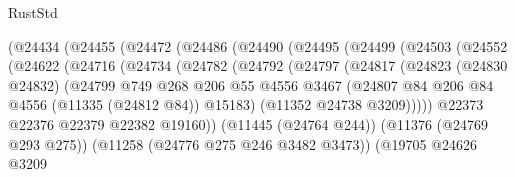 \begin{lexlean}{RustStd}
\begin{coremodule}
{\begin{coremodule}
{{{{{{{{{{{{{{{{{{{{{{{{{{{{{{{{{{{{{{{{{{{{{{{{{{{{{{{{{{{{{{{{{{{{{{{{{{{{{{{{{{{{{                        (@24434
                          (@24455
                            (@24472
                              (@24486
                                (@24490
                                  (@24495
                                    (@24499
                                      (@24503
                                        (@24552
                                          (@24622
                                            (@24716
                                              (@24734
                                                (@24782
                                                  (@24792
                                                    (@24797
                                                      (@24817
                                                        (@24823
                                                          (@24830 @24832)
                                                          (@24799
                                                            @749
                                                            @268
                                                            @206
                                                            @55
                                                            @4556
                                                            @3467
                                                            (@24807
                                                              @84
                                                              @206
                                                              @84
                                                              @4556
                                                              (@11335 (@24812 @84))
                                                              @15183)
                                                            (@11352 @24738 @3209)))))
                                                    @22373
                                                    @22376
                                                    @22379
                                                    @22382
                                                    @19160))
                                                (@11445 (@24764 @244))
                                                (@11376 (@24769 @293 @275))
                                                (@11258 (@24776 @275 @246 @3482 @3473))
                                                (@19705
                                                  @24626
                                                  @3209
}}}}}}}}}}}}}}}}}}}}}}}}}}}}}}}}}}}}}}}}}}}}}}}}}}}}}}}}}}}}}}}}}}}}}}}}}}}}}}}}}}}}}
\end{coremodule}}
\end{coremodule}
\end{lexlean}
